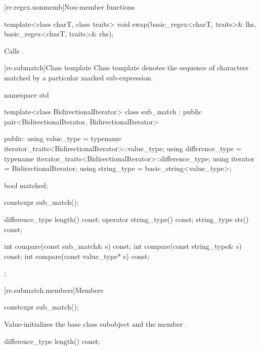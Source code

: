 [re.regex.nonmemb]{Non-member functions}

%
\begin{itemdecl}
template<class charT, class traits>
  void swap(basic_regex<charT, traits>& lhs, basic_regex<charT, traits>& rhs);
\end{itemdecl}

\begin{itemdescr}
\pnum\effects  Calls .
\end{itemdescr}

[re.submatch]{Class template }
\pnum
{}%
Class template  denotes the sequence of characters matched
by a particular marked sub-expression.

\begin{codeblock}
namespace std {
  template<class BidirectionalIterator>
    class sub_match : public pair<BidirectionalIterator, BidirectionalIterator> {
    public:
      using value_type      =
              typename iterator_traits<BidirectionalIterator>::value_type;
      using difference_type =
              typename iterator_traits<BidirectionalIterator>::difference_type;
      using iterator        = BidirectionalIterator;
      using string_type     = basic_string<value_type>;

      bool matched;

      constexpr sub_match();

      difference_type length() const;
      operator string_type() const;
      string_type str() const;

      int compare(const sub_match& s) const;
      int compare(const string_type& s) const;
      int compare(const value_type* s) const;
    };
}
\end{codeblock}


[re.submatch.members]{Members}

%
\begin{itemdecl}
constexpr sub_match();
\end{itemdecl}

\begin{itemdescr}
\pnum
\effects Value-initializes the  base class subobject and the member
.
\end{itemdescr}

%
\begin{itemdecl}
difference_type length() const;
\end{itemdecl}

